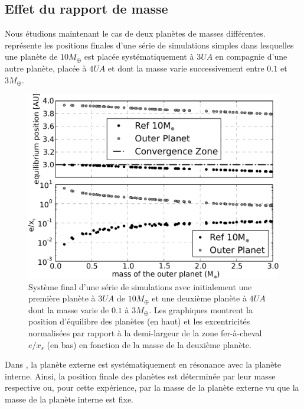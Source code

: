 \subsection{Effet du rapport de masse}
Nous étudions maintenant le cas de deux planètes de masses différentes.  représente les positions finales d'une série de simulations simples dans lesquelles une planète de $10\unit{M_\oplus}$ est placée systématiquement à $3\unit{UA}$ en compagnie d'une autre planète, placée à $4\unit{UA}$ et dont la masse varie successivement entre $0.1$ et $3\unit{M_\oplus}$. 

\begin{figure}[htb]
\centering
\includegraphics[width=0.95\linewidth]{figure/shifted/mass_ratio_influence.pdf}
\caption{Système final d'une série de simulations avec initialement une première planète à $3\unit{UA}$ de $10\unit{M_\oplus}$ et une deuxième planète à $4\unit{UA}$ dont la masse varie de $0.1$ à $3\unit{M_\oplus}$. Les graphiques montrent la position d'équilibre des planètes (en haut) et les excentricités normalisées par rapport à la demi-largeur de la zone fer-à-cheval $e/x_s$ (en bas) en fonction de la masse de la deuxième planète.}\label{fig:mass_ratio_final_pos}
\end{figure}

\bigskip

Dans , la planète externe est systématiquement en résonance  avec la planète interne. Ainsi, la position finale des planètes est déterminée par leur masse respective ou, pour cette expérience, par la masse de la planète externe vu que la masse de la planète interne est fixe. 

